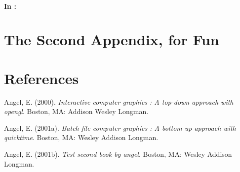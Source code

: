 \documentclass[12pt,twoside]{amherstthesis}
\begin{document}
  \subsubsection{\texorpdfstring{In
  \protect\hyperlink{ref_labels}{}:}{In :}}\label{in}
  
  \chapter{The Second Appendix, for
  Fun}\label{the-second-appendix-for-fun}
  
  \backmatter
  
  \chapter{References}\label{references}
  
  \noindent
  
  \setlength{\parindent}{-0.20in} \setlength{\leftskip}{0.20in}
  \setlength{\parskip}{8pt}
  
  \hypertarget{refs}{}
  \hypertarget{ref-angel2000}{}
  Angel, E. (2000). \emph{Interactive computer graphics : A top-down
  approach with opengl}. Boston, MA: Addison Wesley Longman.
  
  \hypertarget{ref-angel2001}{}
  Angel, E. (2001a). \emph{Batch-file computer graphics : A bottom-up
  approach with quicktime}. Boston, MA: Wesley Addison Longman.
  
  \hypertarget{ref-angel2002a}{}
  Angel, E. (2001b). \emph{Test second book by angel}. Boston, MA: Wesley
  Addison Longman.


\end{document}
